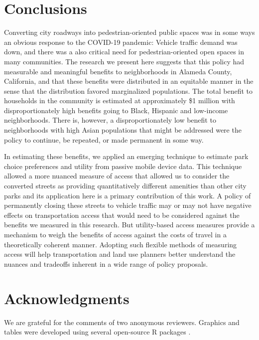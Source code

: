 \documentclass[3p, authoryear, review]{elsarticle} %
\begin{document}
\hypertarget{conclusions}{%
\section{Conclusions}\label{conclusions}}

Converting city roadways into pedestrian-oriented public spaces was in some ways
an obvious response to the COVID-19 pandemic: Vehicle traffic demand was down,
and there was a also critical need for pedestrian-oriented open spaces in many
communities. The research we present here suggests that this policy had
measurable and meaningful benefits to neighborhoods in Alameda County,
California, and that these benefits were distributed in an equitable manner in the sense that the distribution favored marginalized populations. The total benefit to households in the community is estimated
at approximately \$1 million with disproportionately high benefits going to
Black, Hispanic and low-income neighborhoods. There is, however, a
disproportionately low benefit to neighborhoods with high Asian populations that
might be addressed were the policy to continue, be repeated, or made permanent
in some way.

In estimating these benefits, we applied an emerging technique to estimate park
choice preferences and utility from passive mobile device data. This technique
allowed a more nuanced measure of access that allowed us to consider the
converted streets as providing quantitatively different amenities than other city
parks and its application here is a primary contribution of this work.
A policy of permanently closing these streets to vehicle traffic may or
may not have negative effects on transportation access that would need to be
considered against the benefits we measured in this research. But utility-based
access measures provide a mechanism to weigh the benefits of access against the
costs of travel in a theoretically coherent manner. Adopting such flexible
methods of measuring access will help transportation and land use planners
better understand the nuances and tradeoffs inherent in a wide range of policy
proposals.

\hypertarget{acknowledgments}{%
\section*{Acknowledgments}\label{acknowledgments}}

We are grateful for the comments of two anonymous reviewers. Graphics and tables
were developed using several open-source R packages \citep{ggspatial, modelsummary, wesanderson}.


\end{document}

